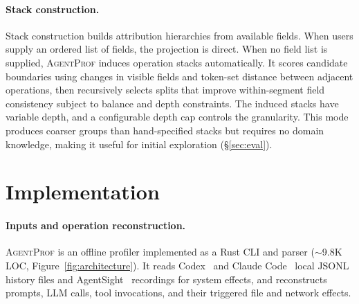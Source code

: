 \documentclass[letterpaper]{article}
\newcommand{\sys}{\textsc{AgentProf}\xspace}
\begin{document}
\paragraph{Stack construction.}
Stack construction builds attribution hierarchies from
available fields.
When users supply an ordered list of fields, the projection is direct.
When no field list is supplied, \sys induces operation stacks automatically.
It scores candidate boundaries using changes in visible fields and token-set
distance between adjacent operations, then recursively selects splits that
improve within-segment field consistency subject to balance and depth
constraints.
The induced stacks have variable depth, and a configurable depth cap
controls the granularity.
This mode produces coarser groups than hand-specified stacks but
requires no domain knowledge, making it useful for initial
exploration (\S\ref{sec:eval}).

\section{Implementation}
\label{sec:impl}

\paragraph{Inputs and operation reconstruction.}
\sys is an offline profiler implemented as a Rust CLI and parser
({$\sim$}9.8K LOC, Figure~\ref{fig:architecture}).
It reads Codex~\cite{openaicodex} and Claude Code~\cite{claudecode} local JSONL history files and AgentSight~\cite{agentsight} recordings for system effects, and reconstructs prompts, LLM calls, tool invocations, and their triggered file and network effects.
\end{document}
